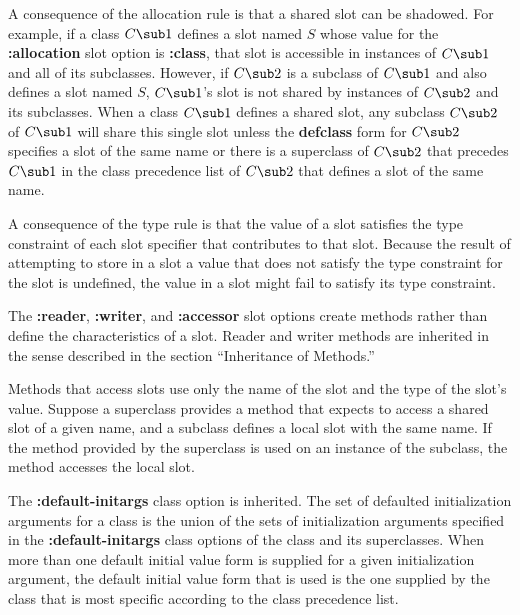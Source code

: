 \endlist

A consequence of the allocation rule is that a shared slot can be
shadowed.  For example, if a class $C\sub 1$ defines a slot named $S$
whose value for the {\bf :allocation} slot option is {\bf :class},
that slot is accessible in instances of $C\sub 1$ and all of its
subclasses.  However, if $C\sub 2$ is a subclass of $C\sub 1$ and also
defines a slot named $S$\negthinspace, $C\sub 1$'s slot is not shared
by instances of $C\sub 2$ and its subclasses. When a class
$C\sub 1$ defines a shared slot, any subclass $C\sub 2$ of $C\sub
1$ will share this single slot unless the {\bf defclass} form for
$C\sub 2$ specifies a slot of the same name or there is a superclass
of $C\sub 2$ that precedes $C\sub 1$ in the class precedence list of
$C\sub 2$ that defines a slot of the same name.

A consequence of the type rule is that the value of a slot satisfies
the type constraint of each slot specifier that contributes to that
slot.  Because the result of attempting to store in a slot a value
that does not satisfy the type constraint for the slot is undefined,
the value in a slot might fail to satisfy its type constraint.

The {\bf :reader}, {\bf :writer}, and {\bf :accessor} slot options
create methods rather than define the characteristics of a slot.
Reader and writer  methods are inherited in the sense described in
the section ``Inheritance of Methods.'' 

Methods that access slots use only the name of the slot and the type
of the slot's value.  Suppose a superclass provides a method that
expects to access a shared slot of a given name, and a subclass defines
a local slot with the same name.  If the method provided by the
superclass is used on an instance of the subclass, the method accesses
the local slot.


The {\bf :default-initargs} class option is inherited.  The set of
defaulted initialization arguments for a class is the union of the
sets of initialization arguments specified in the {\bf
:default-initargs} class options of the class and its superclasses.
When more than one default initial value form is supplied for a given
initialization argument, the default initial value form that is used
is the one supplied by the class that is most specific according to
the class precedence list.

\newpage

